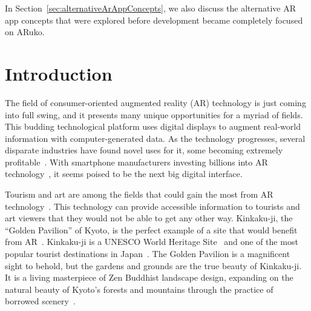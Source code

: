 \documentclass[a4paper, 10pt, american, titlepage]{article}
\begin{document}
In Section~\ref{sec:alternativeArAppConcepts}, we also discuss the alternative
AR app concepts that were explored before development became completely focused
on ARuko.

\clearpage

\begin{singlespace}
	\tableofcontents
	\clearpage

	\listoffigures
	\clearpage

	\listoftables
	\clearpage
\end{singlespace}


\section{Introduction}
\label{sec:introduction}

The field of consumer-oriented augmented reality (AR) technology is just coming
into full swing, and it presents many unique opportunities for a myriad of
fields. This budding technological platform uses digital displays to augment
real-world information with computer-generated data. As the technology
progresses, several disparate industries have found novel uses for it, some
becoming extremely profitable~\autocite{webster2018}. With smartphone
manufacturers investing billions into AR technology~\autocite{mason2016}, it
seems poised to be the next big digital interface.

Tourism and art are among the fields that could gain the most from AR
technology~\autocite{saenz2009, katz2018}. This technology can provide
accessible information to tourists and art viewers that they would not be able
to get any other way. Kinkaku-ji, the ``Golden Pavilion'' of Kyoto, is the
perfect example of a site that would benefit from AR~\autocite{bornoff2000}.
Kinkaku-ji is a UNESCO World Heritage Site~\autocite{unesco} and one of the
most popular tourist destinations in Japan~\autocite{japanguide2019}. The
Golden Pavilion is a magnificent sight to behold, but the gardens and grounds
are the true beauty of Kinkaku-ji. It is a living masterpiece of Zen Buddhist
landscape design, expanding on the natural beauty of Kyoto's forests and
mountains through the practice of borrowed scenery~\autocite{kuitert2002}.
\end{document}
